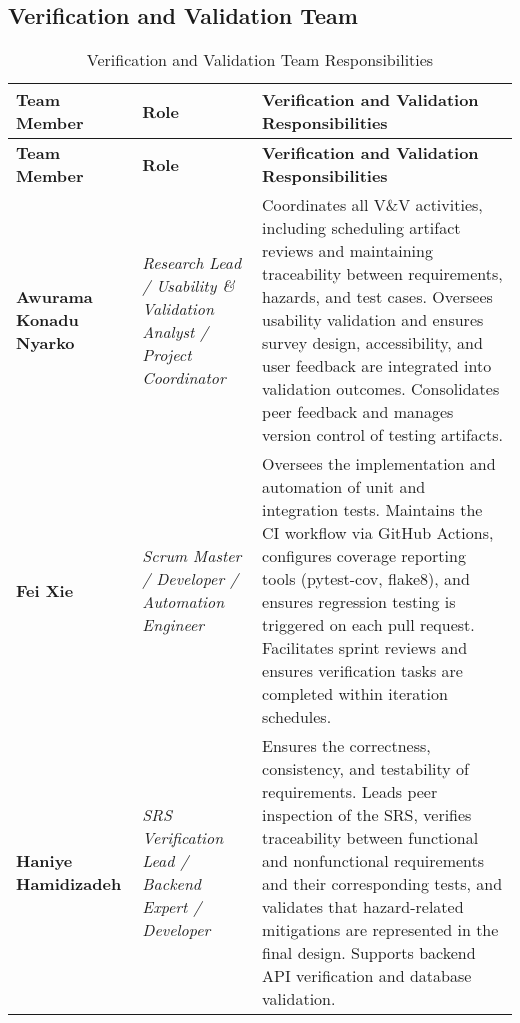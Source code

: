 \documentclass[12pt, titlepage]{article}
\begin{document}
\subsection{Verification and Validation Team}
\label{subsec:vnv-team}
\begin{center}
\footnotesize 
{}
\begin{longtable}{|>{\raggedright\arraybackslash}p{}|
                    >{\raggedright\arraybackslash}p{}|
                    >{\raggedright\arraybackslash}p{}|}
\caption{Verification and Validation Team Responsibilities} \\
\hline
\rowcolor{gray!15}
\textbf{Team Member} & \textbf{Role} & \textbf{Verification and Validation Responsibilities} \\
\hline
\endfirsthead

\hline
\rowcolor{gray!15}
\textbf{Team Member} & \textbf{Role} & \textbf{Verification and Validation Responsibilities} \\
\hline
\endhead

\hline
\endfoot
\hline
\endlastfoot

\textbf{Awurama Konadu Nyarko} &
\textit{Research Lead / Usability \& Validation Analyst / Project Coordinator} &
Coordinates all V\&V activities, including scheduling artifact reviews and maintaining traceability between requirements, hazards, and test cases. Oversees usability validation and ensures survey design, accessibility, and user feedback are integrated into validation outcomes. Consolidates peer feedback and manages version control of testing artifacts. \\
\hline

\textbf{Fei Xie} &
\textit{Scrum Master / Developer / Automation Engineer} &
Oversees the implementation and automation of unit and integration tests. Maintains the CI workflow via GitHub Actions, configures coverage reporting tools (pytest-cov, flake8), and ensures regression testing is triggered on each pull request. Facilitates sprint reviews and ensures verification tasks are completed within iteration schedules. \\
\hline

\textbf{Haniye Hamidizadeh} &
\textit{SRS Verification Lead / Backend Expert / Developer} &
Ensures the correctness, consistency, and testability of requirements. Leads peer inspection of the SRS, verifies traceability between functional and nonfunctional requirements and their corresponding tests, and validates that hazard-related mitigations are represented in the final design. Supports backend API verification and database validation. \\
\hline


\end{longtable}
\end{center}
\end{document}
